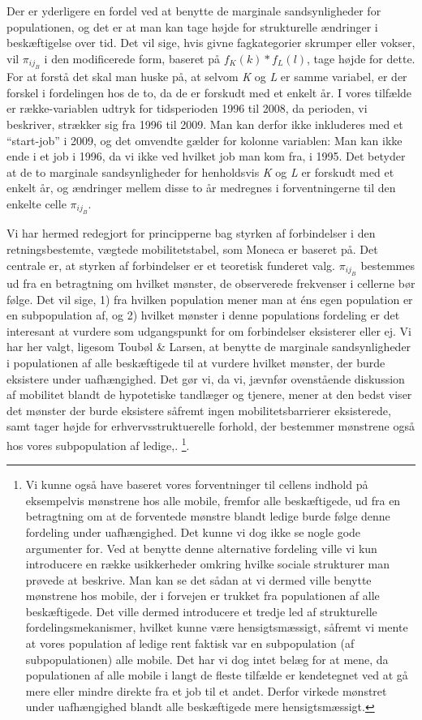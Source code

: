 Der er yderligere en fordel ved at benytte de marginale sandsynligheder for populationen, og det er at man kan tage højde for strukturelle ændringer i beskæftigelse over tid. Det vil sige, hvis givne fagkategorier skrumper eller vokser, vil $\pi_{ij_{B}}$ i den modificerede form, baseret på $f_{K}(k)*f_{L}(l)$, tage højde for dette. For at forstå det skal man huske på, at selvom \emph{K} og \emph{L} er samme variabel, er der forskel i fordelingen hos de to, da de er forskudt med et enkelt år. I vores tilfælde er række-variablen udtryk for tidsperioden 1996 til 2008, da perioden, vi beskriver, strækker  sig fra 1996 til 2009. Man kan derfor ikke inkluderes med et “start-job” i 2009, og det omvendte gælder for kolonne variablen: Man kan ikke ende i et job i 1996, da vi ikke ved hvilket job man kom fra, i 1995. Det betyder at de to marginale sandsynligheder for henholdsvis \emph{K} og \emph{L} er forskudt med et enkelt år, og ændringer mellem disse to år medregnes i forventningerne til den enkelte celle $\pi_{ij_{B}}$.

Vi har hermed redegjort for principperne bag styrken af forbindelser i den retningsbestemte, vægtede mobilitetstabel, som Moneca er baseret på. Det centrale er, at styrken af forbindelser er et teoretisk funderet valg. $\pi_{ij_{B}}$ bestemmes ud fra en betragtning om hvilket mønster, de observerede frekvenser i cellerne bør følge. Det vil sige, 1) fra hvilken population mener man at éns egen population er en subpopulation af, og 2) hvilket mønster i denne populations fordeling er det interesant at vurdere som udgangspunkt for om forbindelser eksisterer eller ej.  Vi har her valgt, ligesom Toubøl \& Larsen, at benytte de marginale sandsynligheder i populationen af alle beskæftigede til at vurdere hvilket mønster, der burde eksistere under uafhængighed. Det gør vi, da vi, jævnfør ovenstående diskussion af mobilitet blandt de hypotetiske tandlæger og tjenere, mener at den bedst viser det mønster der burde eksistere såfremt ingen mobilitetsbarrierer eksisterede, samt tager højde for erhvervsstruktuerelle forhold, der bestemmer mønstrene også hos vores subpopulation af ledige,.%
%
\footnote{Vi kunne også have baseret vores forventninger til cellens indhold på eksempelvis mønstrene hos alle mobile, fremfor alle beskæftigede, ud fra en betragtning om at de forventede mønstre blandt ledige burde følge denne fordeling under uafhængighed. Det kunne vi dog ikke se nogle gode argumenter for. Ved at benytte denne alternative fordeling ville vi kun introducere en række usikkerheder omkring hvilke sociale strukturer man prøvede at beskrive. Man kan se det sådan at vi dermed ville benytte mønstrene hos mobile, der i forvejen er trukket fra populationen af alle beskæftigede. Det ville dermed introducere et tredje led af strukturelle fordelingsmekanismer, hvilket kunne være hensigtsmæssigt, såfremt vi mente at vores population af ledige rent faktisk var en subpopulation (af subpopulationen) alle mobile. Det har vi dog intet belæg for at mene, da populationen af alle mobile i langt de fleste tilfælde er kendetegnet ved at gå mere eller mindre direkte fra et job til et andet. Derfor virkede mønstret under uafhængighed blandt alle beskæftigede mere hensigtsmæssigt.}.



